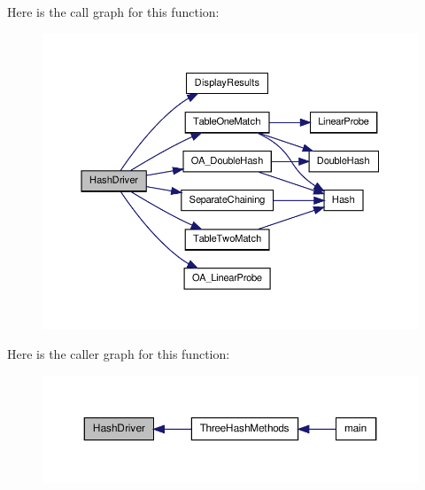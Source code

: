 Here is the call graph for this function:\nopagebreak
\begin{figure}[H]
\begin{center}
\leavevmode
\includegraphics[width=384pt]{_bradshaw-_mansfield-_assn2-_h_a_s_h_prog_8cpp_acb3d9aabc9ab7fbb9d3ae15ad62c32f1_cgraph}
\end{center}
\end{figure}




Here is the caller graph for this function:\nopagebreak
\begin{figure}[H]
\begin{center}
\leavevmode
\includegraphics[width=358pt]{_bradshaw-_mansfield-_assn2-_h_a_s_h_prog_8cpp_acb3d9aabc9ab7fbb9d3ae15ad62c32f1_icgraph}
\end{center}
\end{figure}


